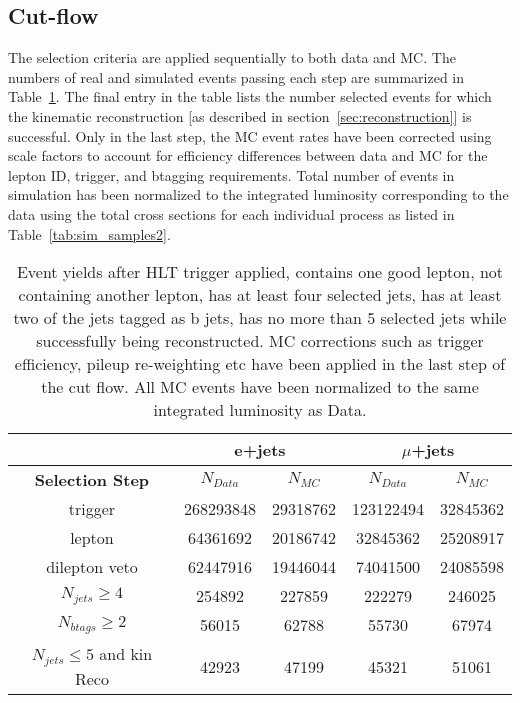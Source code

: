 \subsection{Cut-flow}

The selection criteria are applied sequentially to both data and MC.  The numbers of real and simulated events passing each step are summarized in Table~\ref{tab:cut-flow}.  The final entry in the table lists the number selected events for which the kinematic reconstruction [as described in section~\ref{sec:reconstruction}] is successful. Only in the last step, the MC event rates have been corrected using scale factors to account for efficiency differences between data and MC for the lepton ID, trigger, and btagging requirements. Total number of events in simulation has been normalized to the integrated luminosity corresponding to the data using the total cross sections for each individual process as listed in Table~\ref{tab:sim_samples2}. 


\begin{table}[h!]
\small
\centering
\begin{tabular}{|c | c  c | c  c|}
\hline
 & \multicolumn{2}{|c|}{e+jets}&\multicolumn{2}{|c|}{$\mu$+jets} \\
\hline
\textbf{Selection Step} & $N_{Data}$ & $N_{MC}$ & $N_{Data}$ & $N_{MC}$ \\
\hline
trigger & 268293848 & 29318762 & 123122494 & 32845362  \\
lepton & 64361692 & 20186742 & 32845362 & 25208917 \\ 
dilepton veto & 62447916 & 19446044 & 74041500 & 24085598  \\ 
$N_{jets}\geqslant4$ & 254892 & 227859 & 222279 & 246025  \\
$N_{btags}\geqslant2$ & 56015 & 62788 & 55730 & 67974  \\
$N_{jets}\leqslant5$ and kin Reco & 42923 & 47199 & 45321 & 51061  \\
\hline
\end{tabular}
\caption{\small Event yields after HLT trigger applied, contains one good lepton, not containing another lepton, has at least four selected jets, has at least two of the jets tagged as b jets, has no more than 5 selected jets while successfully being reconstructed. MC corrections such as trigger efficiency, pileup re-weighting etc have been applied in the last step of the cut flow. All MC events have been normalized to the same integrated luminosity as Data.}

\label{tab:cut-flow}
\end{table}

